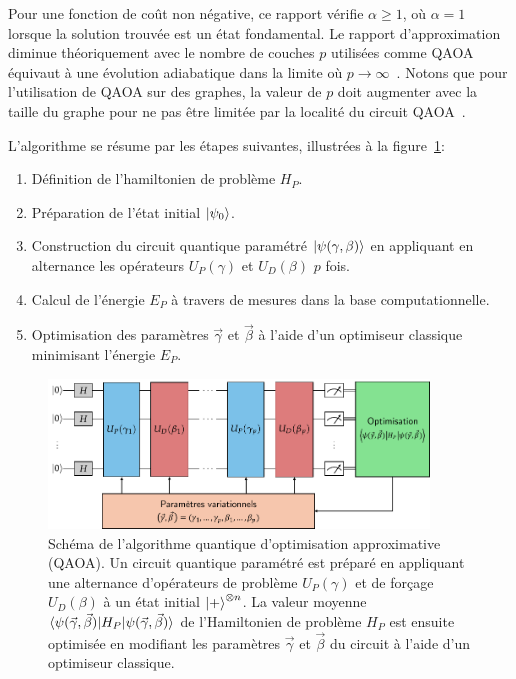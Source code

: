 Pour une fonction de coût non négative, ce rapport vérifie $\alpha \geq 1$, où $\alpha=1$ lorsque la solution trouvée est un état fondamental. Le rapport d'approximation diminue théoriquement avec le nombre de couches $p$ utilisées comme QAOA équivaut à une évolution adiabatique dans la limite où $p \to \infty$~\cite{farhiQuantumApproximateOptimization2014}. Notons que pour l'utilisation de QAOA sur des graphes, la valeur de $p$ doit augmenter avec la taille du graphe pour ne pas être limitée par la localité du circuit QAOA~\cite{farhiQuantumApproximateOptimization2020}.

L'algorithme se résume par les étapes suivantes, illustrées à la figure~\ref{fig:qaoa}:

\begin{enumerate}[(1)]
    \item Définition de l'hamiltonien de problème $H_{P}$.
    \item Préparation de l'état initial $\ket{\psi_{0}}$.
    \item Construction du circuit quantique paramétré $\ket{\psi(\gamma, \beta)}$ en appliquant en alternance les opérateurs $U_{P}(\gamma)$ et $U_{D}(\beta)$ $p$ fois.
    \item Calcul de l'énergie $E_{P}$ à travers de mesures dans la base computationnelle.
    \item Optimisation des paramètres $\vec{\gamma}$ et $\vec{\beta}$ à l'aide d'un optimiseur classique minimisant l'énergie $E_{P}$.
\end{enumerate}

\begin{figure}[h]
    \centering
    \includegraphics[width=0.9\textwidth]{figures/qaoa.pdf}
    \caption[Algorithme quantique d'optimisation approximative]{Schéma de l'algorithme quantique d'optimisation approximative (QAOA). Un circuit quantique paramétré est préparé en appliquant une alternance d'opérateurs de problème $U_{P}(\gamma)$ et de forçage $U_{D}(\beta)$ à un état initial $\ket{+}^{\otimes n}$. La valeur moyenne $\braket{ \psi(\vec{\gamma}, \vec{\beta}) | H_{P} | \psi(\vec{\gamma}, \vec{\beta}) }$ de l'Hamiltonien de problème $H_{P}$ est ensuite optimisée en modifiant les paramètres $\vec{\gamma}$ et $\vec{\beta}$ du circuit à l'aide d'un optimiseur classique.}
    \label{fig:qaoa}
\end{figure}

